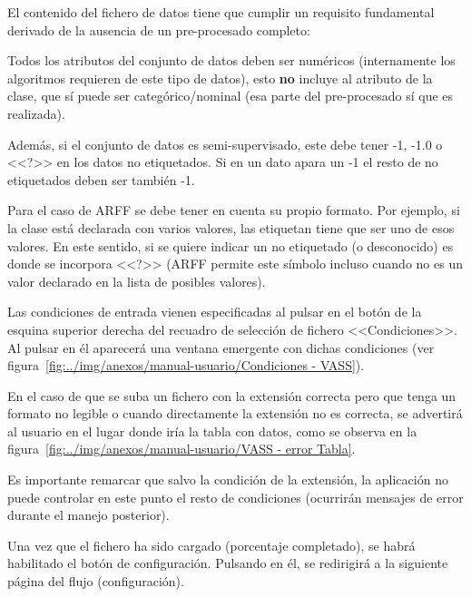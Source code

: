 El contenido del fichero de datos tiene que cumplir un requisito fundamental
derivado de la ausencia de un pre-procesado completo: 

\begin{tcolorbox}[colback=red!5!white,colframe=red!75!black,fontupper=\footnotesize,title=Requisito fundamental]
	Todos los atributos del conjunto de datos deben ser numéricos (internamente los
	algoritmos requieren de este tipo de datos), esto \textbf{no} incluye al
	atributo de la clase, que sí puede ser categórico/nominal (esa parte del
	pre-procesado sí que es realizada).
\end{tcolorbox}

Además, si el conjunto de datos es semi-supervisado, este debe tener -1, -1.0 o
<<?>> en los datos no etiquetados. Si en un dato apara un -1 el resto de no
etiquetados deben ser también -1.

Para el caso de ARFF se debe tener en cuenta su propio formato. Por ejemplo, si
la clase está declarada con varios valores, las etiquetan tiene que ser uno de
esos valores. En este sentido, si se quiere indicar un no etiquetado (o
desconocido) es donde se incorpora <<?>> (ARFF permite este símbolo incluso
cuando no es un valor declarado en la lista de posibles valores).

Las condiciones de entrada vienen especificadas al pulsar en el botón de la
esquina superior derecha del recuadro de selección de fichero <<Condiciones>>.
Al pulsar en él aparecerá una ventana emergente con dichas condiciones (ver
figura~\ref{fig:../img/anexos/manual-usuario/Condiciones - VASS}).


En el caso de que se suba un fichero con la extensión correcta pero que tenga un formato no legible o cuando directamente la extensión no es correcta, se advertirá al usuario en el lugar donde iría la tabla con datos, como se observa en la figura~\ref{fig:../img/anexos/manual-usuario/VASS - error Tabla}.


Es importante remarcar que salvo la condición de la extensión, la aplicación no puede controlar en este punto el resto de condiciones (ocurrirán mensajes de error durante el manejo posterior).

Una vez que el fichero ha sido cargado (porcentaje completado), se habrá habilitado el botón de configuración. Pulsando en él, se redirigirá a la siguiente página del flujo (configuración).


